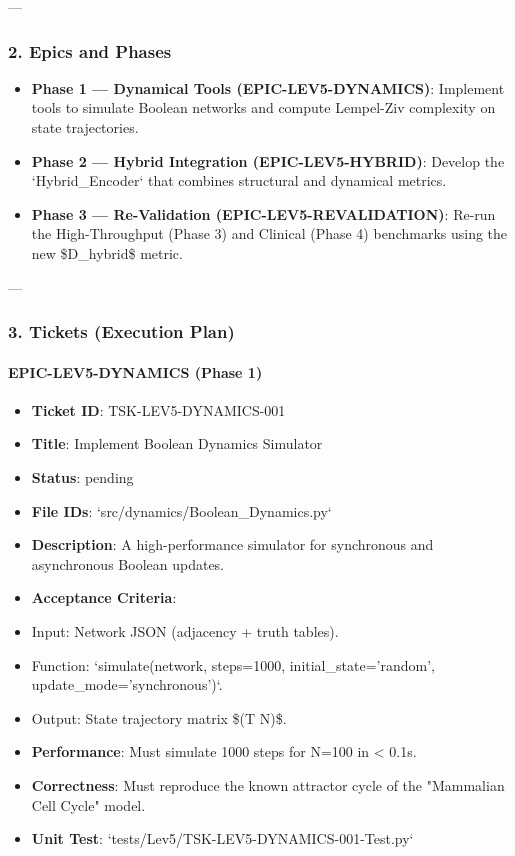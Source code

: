 \documentclass{article}
\begin{document}
---

\subsubsection{2. Epics and Phases}

\begin{itemize}
\item   \textbf{Phase 1 — Dynamical Tools (EPIC-LEV5-DYNAMICS)}: Implement tools to simulate Boolean networks and compute Lempel-Ziv complexity on state trajectories.
\item   \textbf{Phase 2 — Hybrid Integration (EPIC-LEV5-HYBRID)}: Develop the `Hybrid\_Encoder` that combines structural and dynamical metrics.
\item   \textbf{Phase 3 — Re-Validation (EPIC-LEV5-REVALIDATION)}: Re-run the High-Throughput (Phase 3) and Clinical (Phase 4) benchmarks using the new \$D\_{hybrid}\$ metric.
\end{itemize}

---

\subsubsection{3. Tickets (Execution Plan)}

\paragraph{EPIC-LEV5-DYNAMICS (Phase 1)}

\begin{itemize}
\item   \textbf{Ticket ID}: TSK-LEV5-DYNAMICS-001
\item   \textbf{Title}: Implement Boolean Dynamics Simulator
\item   \textbf{Status}: pending
\item   \textbf{File IDs}: `src/dynamics/Boolean\_Dynamics.py`
\item   \textbf{Description}: A high-performance simulator for synchronous and asynchronous Boolean updates.
\item   \textbf{Acceptance Criteria}:
\item   Input: Network JSON (adjacency + truth tables).
\item   Function: `simulate(network, steps=1000, initial\_state='random', update\_mode='synchronous')`.
\item   Output: State trajectory matrix \$(T \times N)\$.
\item   \textbf{Performance}: Must simulate 1000 steps for N=100 in < 0.1s.
\item   \textbf{Correctness}: Must reproduce the known attractor cycle of the "Mammalian Cell Cycle" model.
\item   \textbf{Unit Test}: `tests/Lev5/TSK-LEV5-DYNAMICS-001-Test.py`
\end{itemize}
\end{document}
